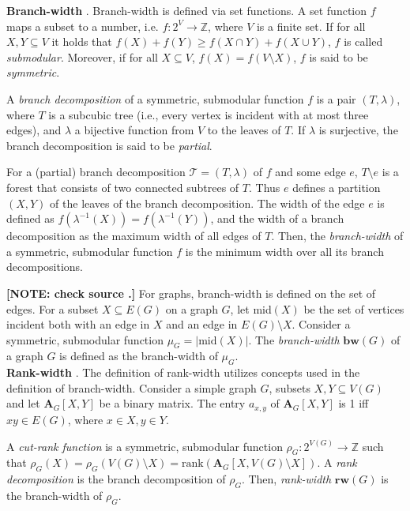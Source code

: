 \documentclass{article}
\begin{document}
\noindent
\textbf{Branch-width} \cite{DBLP:journals/jct/OumS06, DBLP:journals/jgt/Oum08}.
Branch-width is defined via set functions.
A set function $f$ maps a subset to a number, i.e. $f : 2^V \rightarrow \mathbb{Z}$, where $V$ is a finite set.
If for all $X,Y \subseteq V$ it holds that $f(X)+f(Y) \geq f(X\cap Y) + f(X\cup Y)$, $f$ is called {\em submodular}.
Moreover, if for all $X\subseteq V$, $f(X) = f(V \setminus X)$, $f$ is said to be {\em symmetric}.

A {\em branch decomposition} of a symmetric, submodular function $f$ is a pair $(T, \lambda)$, where $T$ is a subcubic tree (i.e., every vertex is incident with at most three edges), and $\lambda$ a bijective function from $V$ to the leaves of $T$.
If $\lambda$ is surjective, the branch decomposition is said to be {\em partial}.

For a (partial) branch decomposition $\mathcal{T} = (T,\lambda)$ of $f$ and some edge $e$, $T \setminus e$ is a forest that consists of two connected subtrees of $T$.
Thus $e$ defines a partition $(X,Y)$ of the leaves of the branch decomposition.
The width of the edge $e$ is defined as $f(\lambda^{-1}(X)) = f(\lambda^{-1}(Y))$, and the width of a branch decomposition as the maximum width of all edges of $T$.
Then, the {\em branch-width} of a symmetric, submodular function $f$ is the minimum width over all its branch decompositions.

\textbf{[NOTE: check source \cite{DBLP:journals/jgt/Oum08}.]} 
For graphs, branch-width is defined on the set of edges.
For a subset $X \subseteq E(G)$ on a graph $G$, let mid$(X)$ be the set of vertices incident both with an edge in $X$ and an edge in $E(G) \setminus X$.
Consider a symmetric, submodular function $\mu_G = |\text{mid}(X)|$.
The {\em branch-width} $\mathbf{bw}(G)$ of a graph $G$ is defined as the branch-width of $\mu_G$. \\

\noindent
\textbf{Rank-width} \cite{DBLP:journals/fuin/GanianHO13}.
The definition of rank-width utilizes concepts used in the definition of branch-width.
Consider a simple graph $G$, subsets $X,Y \subseteq V(G)$ and let $\mathbf{A}_G[X,Y]$ be a binary matrix.
The entry $a_{x,y}$ of $\mathbf{A}_G[X,Y]$ is 1 iff $xy \in E(G)$, where $x\in X, y\in Y$.

A {\em cut-rank function} is a symmetric, submodular function $\rho_G : 2^{V(G)} \rightarrow \mathbb{Z}$ such that $\rho_G(X)=\rho_G(V(G)\setminus X) = \text{rank}(\mathbf{A}_G[X, V(G)\setminus X])$.
A {\em rank decomposition} is the branch decomposition of $\rho_G$.
Then, {\em rank-width} $\textbf{rw}(G)$ is the branch-width of $\rho_G$. \\
\end{document}
